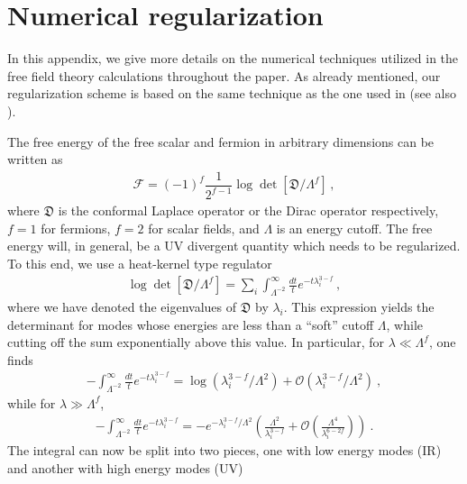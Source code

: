 \documentclass[12pt]{article}
\numberwithin{equation}{section}
\begin{document}
\section{Numerical regularization}
\label{ff}


In this appendix, we give more details on the numerical techniques utilized in the free field theory calculations throughout the paper. As already mentioned, our regularization scheme is based on the same technique as the one used in \cite{Anninos:2012ft} (see also \cite{Bobev:2016sap}). 

The free energy of the free scalar and fermion in arbitrary dimensions can be written as 
%
\begin{align}\label{eqn:Fdetdef}
 \mathcal{F} = (-1)^f\dfrac{1}{2^{f-1}}\log \det \left[\mathfrak{D}/\Lambda^f \right]\, ,
\end{align}
%
where $\mathfrak{D}$ is the conformal Laplace operator or the Dirac operator respectively, $f=1$ for fermions, $f=2$ for scalar fields, and $\Lambda$ is an energy cutoff. The free energy will, in general, be a UV divergent quantity which needs to be regularized. To this end, we use a heat-kernel type regulator \cite{Anninos:2012ft, Vassilevich:2003xt} 
%
\begin{align}
	\log \det\left[\mathfrak{D}/\Lambda^f\right] = \sum_i \int_{\Lambda^{-2}}^{\infty}\frac{dt}{t} e^{-t\lambda_i^{3-f}} \, ,\label{eqn:regulator}
\end{align}
%
where we have denoted the eigenvalues of $\mathfrak{D}$ by $\lambda_i$. This expression yields the determinant for modes whose energies are less than a ``soft'' cutoff $ \Lambda$, while cutting off the sum exponentially above this value. In particular, for $\lambda  \ll \Lambda^f$, one finds
%
\begin{align}
	- \int_{\Lambda^{-2}}^{\infty}\frac{dt}{t} e^{-t\lambda_i^{3-f}} =\log(\lambda_i^{3-f}/ \Lambda^{2})+\mathcal{O}(\lambda_i^{3-f}/ \Lambda^{2}) \ ,\label{eqn:upperincompleteGamma}
\end{align}
%
while for $\lambda  \gg  \Lambda^f$,
%
\begin{align}
	- \int_{\Lambda^{-2}}^{\infty}\frac{dt}{t} e^{-t\lambda_i^{3-f}} =-e^{-\lambda_i^{3-f}/ \Lambda^{2}}\left(\frac{\Lambda^{2}}{\lambda_i^{3-f} }+ \mathcal{O}\left(\frac{\Lambda^{4}}{\lambda_i^{6-2f}}\right)\right) \ .
\end{align}
%
The integral can now be split into two pieces, one with low energy modes (IR) and another with high energy modes (UV)
\end{document}
